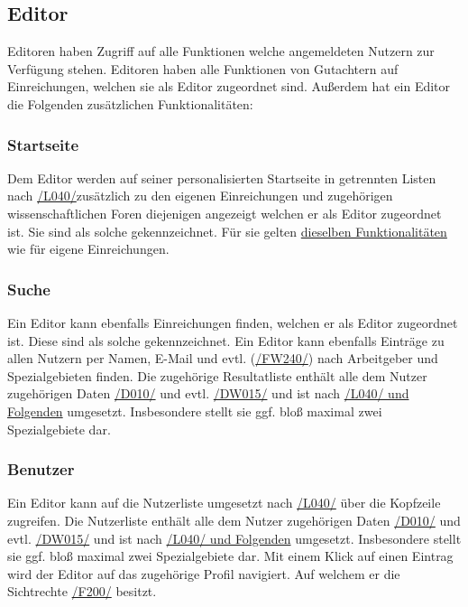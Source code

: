 \subsection{Editor}\label{funkt:editor}
Editoren haben Zugriff auf alle Funktionen welche angemeldeten Nutzern zur Verfügung stehen.
Editoren haben alle Funktionen von Gutachtern auf Einreichungen, welchen sie als Editor zugeordnet sind.
Außerdem hat ein Editor die Folgenden zusätzlichen Funktionalitäten:

\subsubsection{Startseite}
\begin{description}
     Dem Editor werden auf seiner personalisierten Startseite in getrennten Listen nach \hyperref[leist:040]{/L040/}zusätzlich zu den eigenen
    Einreichungen und zugehörigen wissenschaftlichen Foren diejenigen angezeigt welchen er als Editor zugeordnet ist.
    Sie sind als solche gekennzeichnet.
    Für sie gelten \hyperref[nut:start]{dieselben Funktionalitäten} wie für eigene Einreichungen.
\end{description}

\subsubsection{Suche} \label{ed:suche}
\begin{description}
     Ein Editor kann ebenfalls Einreichungen finden, welchen er als Editor zugeordnet ist.
    Diese sind als solche gekennzeichnet.
     Ein Editor kann ebenfalls Einträge zu allen Nutzern per Namen, E-Mail und
    evtl. (\hyperref[funkt:240]{/FW240/}) nach Arbeitgeber und Spezialgebieten finden.
    Die zugehörige Resultatliste enthält alle dem Nutzer zugehörigen Daten \hyperref[d010]{/D010/} und evtl. \hyperref[d015]{/DW015/}
    und ist nach \hyperref[leist:040]{/L040/ und Folgenden} umgesetzt. Insbesondere stellt sie ggf. bloß maximal zwei Spezialgebiete dar.
\end{description}

\subsubsection{Benutzer} \label{ed:benutzer}
\begin{description}
     Ein Editor kann auf die Nutzerliste umgesetzt nach \hyperref[leist:40]{/L040/} über die Kopfzeile zugreifen.
     Die Nutzerliste enthält alle dem Nutzer zugehörigen Daten \hyperref[d010]{/D010/} und evtl. \hyperref[d015]{/DW015/}
    und ist nach \hyperref[leist:040]{/L040/ und Folgenden} umgesetzt. Insbesondere stellt sie ggf. bloß maximal zwei Spezialgebiete dar.
     Mit einem Klick auf einen Eintrag wird der Editor auf das zugehörige Profil navigiert.
    Auf welchem er die Sichtrechte \hyperref[funkt:200]{/F200/} besitzt.
\end{description}

